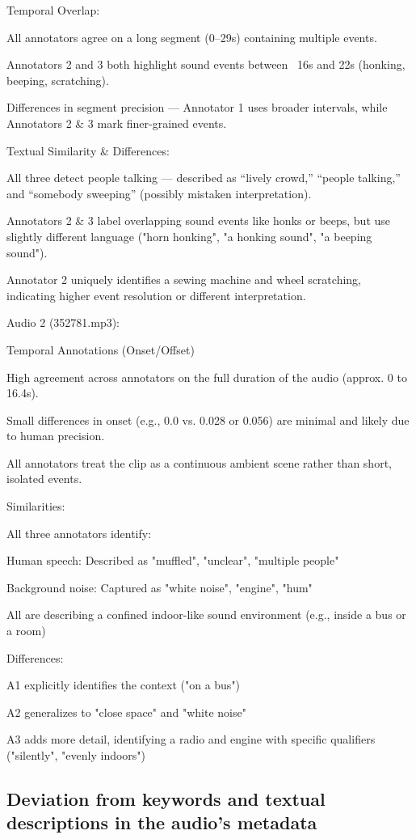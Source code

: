\documentclass{article}
\begin{document}
Temporal Overlap:

All annotators agree on a long segment (0–29s) containing multiple events.

Annotators 2 and 3 both highlight sound events between ~16s and 22s (honking, beeping, scratching).

Differences in segment precision — Annotator 1 uses broader intervals, while Annotators 2 & 3 mark finer-grained events.

Textual Similarity & Differences:

All three detect people talking — described as “lively crowd,” “people talking,” and “somebody sweeping” (possibly mistaken interpretation).

Annotators 2 & 3 label overlapping sound events like honks or beeps, but use slightly different language ("horn honking", "a honking sound", "a beeping sound").

Annotator 2 uniquely identifies a sewing machine and wheel scratching, indicating higher event resolution or different interpretation.

Audio 2 (352781.mp3):

Temporal Annotations (Onset/Offset)

High agreement across annotators on the full duration of the audio (approx. 0 to 16.4s).

Small differences in onset (e.g., 0.0 vs. 0.028 or 0.056) are minimal and likely due to human precision.

All annotators treat the clip as a continuous ambient scene rather than short, isolated events.

Similarities:

All three annotators identify:

Human speech: Described as "muffled", "unclear", "multiple people"

Background noise: Captured as "white noise", "engine", "hum"

All are describing a confined indoor-like sound environment (e.g., inside a bus or a room)

Differences:

A1 explicitly identifies the context ("on a bus")

A2 generalizes to "close space" and "white noise"

A3 adds more detail, identifying a radio and engine with specific qualifiers ("silently", "evenly indoors")

\subsection{Deviation from keywords and textual descriptions in the
audio’s metadata}
\end{document}
